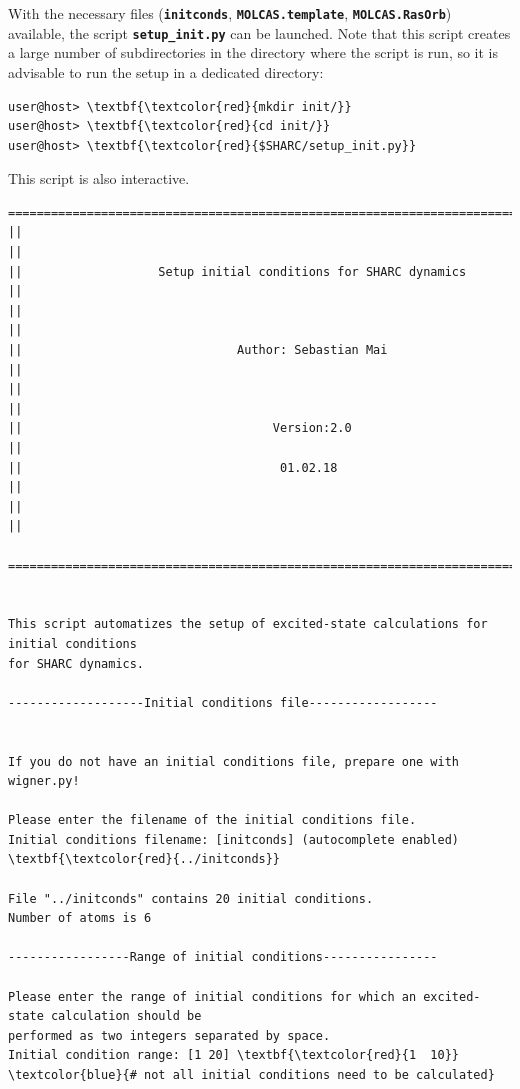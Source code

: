 \documentclass[a4paper,11pt,DIV=15,openany]{scrbook}
\newcommand{\ttt}[1]{\textbf{\texttt{#1}}}
\begin{document}
With the necessary files (\ttt{initconds}, \ttt{MOLCAS.template}, \ttt{MOLCAS.RasOrb}) available, the script \ttt{setup\_init.py} can be launched.
Note that this script creates a large number of subdirectories in the directory where the script is run, so it is advisable to run the setup in a dedicated directory:
\begin{Verbatim}[commandchars=\\\{\}]
user@host> \textbf{\textcolor{red}{mkdir init/}}
user@host> \textbf{\textcolor{red}{cd init/}}
user@host> \textbf{\textcolor{red}{$SHARC/setup_init.py}}
\end{Verbatim}
This script is also interactive. 

\begin{oframed}
\footnotesize\begin{Verbatim}[commandchars=\\\{\}]
  ================================================================================
||                                                                                ||
||                   Setup initial conditions for SHARC dynamics                  ||
||                                                                                ||
||                              Author: Sebastian Mai                             ||
||                                                                                ||
||                                   Version:2.0                                  ||
||                                    01.02.18                                    ||
||                                                                                ||
  ================================================================================


This script automatizes the setup of excited-state calculations for initial conditions
for SHARC dynamics.

-------------------Initial conditions file------------------


If you do not have an initial conditions file, prepare one with wigner.py!

Please enter the filename of the initial conditions file.
Initial conditions filename: [initconds] (autocomplete enabled) \textbf{\textcolor{red}{../initconds}}

File "../initconds" contains 20 initial conditions.
Number of atoms is 6

-----------------Range of initial conditions----------------

Please enter the range of initial conditions for which an excited-state calculation should be 
performed as two integers separated by space.
Initial condition range: [1 20] \textbf{\textcolor{red}{1  10}}    \textcolor{blue}{# not all initial conditions need to be calculated}


\end{Verbatim}
\end{oframed}
\end{document}
